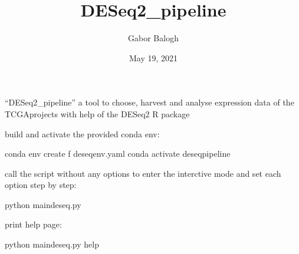 \documentclass[letterpaper,10pt,english]{sphinxmanual}
\title{DESeq2\_pipeline}
\date{May 19, 2021}
\author{Gabor Balogh}
\begin{document}
\pagestyle{empty}
\sphinxmaketitle
\pagestyle{plain}
\sphinxtableofcontents
\pagestyle{normal}
\label{\detokenize{index::doc}}


\sphinxAtStartPar
“DESeq2\_pipeline” a tool to choose, harvest and analyse expression data of
the TCGA\sphinxhyphen{}projects with help of the DESeq2 R package

\sphinxAtStartPar
build and activate the provided conda env:

\begin{sphinxVerbatim}[commandchars=\\\{\}]
\PYGZdl{} conda env create \PYGZhy{}f deseq\PYGZus{}env.yaml
\PYGZdl{} conda activate deseq\PYGZus{}pipeline
\end{sphinxVerbatim}

\sphinxAtStartPar
call the script without any options to enter the interctive mode and set
each option step by step:

\begin{sphinxVerbatim}[commandchars=\\\{\}]
\PYGZdl{} python main\PYGZus{}deseq.py
\end{sphinxVerbatim}

\sphinxAtStartPar
print help page:

\begin{sphinxVerbatim}[commandchars=\\\{\}]
\PYGZdl{} python main\PYGZus{}deseq.py \PYGZhy{}\PYGZhy{}help
\end{sphinxVerbatim}
\end{document}
